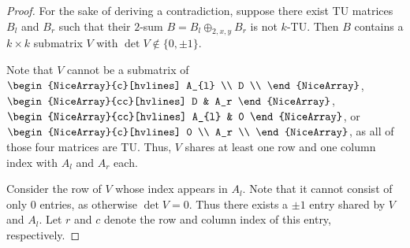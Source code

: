 \begin{proof}
    For the sake of deriving a contradiction, suppose there exist TU matrices $B_{l}$ and $B_{r}$ such that their $2$-sum $B = B_{l} \oplus_{2, x, y} B_{r}$ is not $k$-TU. Then $B$ contains a $k \times k$ submatrix $V$ with $\det V \notin \{0, \pm 1\}$.

    Note that $V$ cannot be a submatrix of $\begin{NiceArray}{c}[hvlines] A_{l} \\ D \\ \end{NiceArray}$, $\begin{NiceArray}{cc}[hvlines] D & A_r \end{NiceArray}$, $\begin{NiceArray}{cc}[hvlines] A_{l} & 0 \end{NiceArray}$, or  $\begin{NiceArray}{c}[hvlines] 0 \\ A_r \\ \end{NiceArray}$, as all of those four matrices are TU. Thus, $V$ shares at least one row and one column index with $A_{l}$ and $A_{r}$ each.

    Consider the row of $V$ whose index appears in $A_{l}$. Note that it cannot consist of only $0$ entries, as otherwise $\det V = 0$. Thus there exists a $\pm 1$ entry shared by $V$ and $A_{l}$. Let $r$ and $c$ denote the row and column index of this entry, respectively.


\end{proof}
